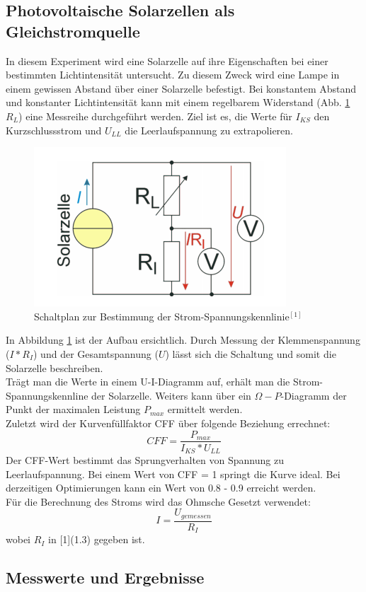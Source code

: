 \documentclass[12pt,a4paper]{article}
\begin{document}
\begin{multicols}{2}
\section{Photovoltaische Solarzellen als Gleichstromquelle}
In diesem Experiment wird eine Solarzelle auf ihre Eigenschaften bei einer bestimmten Lichtintensität untersucht. Zu diesem Zweck wird eine Lampe in einem gewissen Abstand über einer Solarzelle befestigt. Bei konstantem Abstand und konstanter Lichtintensität kann mit einem regelbarem Widerstand (Abb. \ref{fig:schaltbild_solarzelle} $R_L$) eine Messreihe durchgeführt werden. Ziel ist es, die Werte für $I_{KS}$ den Kurzschlussstrom und $U_{LL}$ die Leerlaufspannung zu extrapolieren. \\
\begin{figure}[H]
	\centering
	\includegraphics[scale=0.6]{./figure/solarzelle_schaltplan.png}
	\caption{Schaltplan zur Bestimmung der Strom-Spannungskennlinie$^{[1]}$}
	\label{fig:schaltbild_solarzelle}
\end{figure}
\noindent
In Abbildung \ref{fig:schaltbild_solarzelle} ist der Aufbau ersichtlich. Durch Messung der Klemmenspannung ($I * R_I$) und der Gesamtspannung ($U$) lässt sich die Schaltung und somit die Solarzelle beschreiben.\\
Trägt man die Werte in einem U-I-Diagramm auf, erhält man die Strom-Spannungskennline der Solarzelle. Weiters kann über ein $\Omega-P$-Diagramm der Punkt der maximalen Leistung $P_{max}$ ermittelt werden.\\
Zuletzt wird der Kurvenfüllfaktor CFF über folgende Beziehung errechnet:
$$CFF = \frac{P_{max}}{I_{KS}*U_{LL}}$$
Der CFF-Wert bestimmt das Sprungverhalten von Spannung zu Leerlaufspannung. Bei einem Wert von CFF = 1 springt die Kurve ideal. Bei derzeitigen Optimierungen kann ein Wert von 0.8 - 0.9 erreicht werden.\\
Für die Berechnung des Stroms wird das Ohmsche Gesetzt verwendet:
$$I = \frac{U_{gemessen}}{R_I}$$
wobei $R_I$ in [1](1.3) gegeben ist.
\subsection{Messwerte und Ergebnisse}
\end{multicols}
\end{document}
